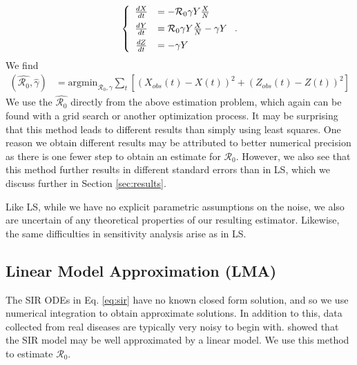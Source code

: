 \documentclass[12pt]{article}
\newcommand{\rr}{\ensuremath{\mathcal{R}_0}}
\begin{document}
\begin{align*}
  \left \{
  \begin{array}{cl}
    \frac{dX}{dt} &= - \rr \gamma Y \frac{X}{N}\vspace{.5em}\\
    \frac{dY}{dt} &=  \rr \gamma Y \frac{X}{N}  - \gamma Y\vspace{.5em} \\
    \frac{dZ}{dt} &=  - \gamma Y 
  \end{array}
  \right . .
  \end{align*}
We find
\begin{align*}
(\hat{\rr}, \hat{\gamma} ) &= \text{argmin}_{\rr, \gamma} \sum_{t} \left [ \left (X_{obs}(t) - X(t)\right )^2 + \left ( Z_{obs}(t) - Z(t) \right )^2 \right ]
\end{align*}
We use the $\hat{\rr}$ directly from the above estimation problem, which again can be found with a grid search or another optimization process.  It may be surprising that this method leads to different results than simply using least squares.  One reason we obtain different results may be attributed to better numerical precision as there is one fewer step to obtain an estimate for $\rr$.  However, we also see that this method further results in different standard errors than in LS, which we discuss further in Section \ref{sec:results}.

Like LS, while we have no explicit parametric assumptions on the noise, we also are uncertain of any theoretical properties of our resulting estimator.  Likewise, the same difficulties in sensitivity analysis arise as in LS.



\subsection{Linear Model Approximation (LMA)}\label{linear-model-approximation-degree-10}

The SIR ODEs in Eq. \ref{eq:sir} have no known closed form solution, and so we use numerical integration to obtain approximate solutions.  In addition to this, data collected from real diseases are typically very noisy to begin with.  \cite{chang2017} showed that the SIR model may be well approximated by a linear model.  We use this method to estimate $\rr$.
\end{document}
